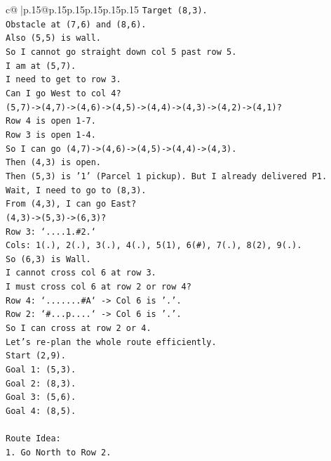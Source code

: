\documentclass{article}
\begin{document}
{\begin{supertabular}{c@{$\;$}|p{.15\linewidth}@{}p{.15\linewidth}p{.15\linewidth}p{.15\linewidth}p{.15\linewidth}p{.15\linewidth}}
{{{\texttt{Target (8,3).} \\
\texttt{Obstacle at (7,6) and (8,6).} \\
\texttt{Also (5,5) is wall.} \\
\texttt{So I cannot go straight down col 5 past row 5.} \\
\texttt{I am at (5,7).} \\
\texttt{I need to get to row 3.} \\
\texttt{Can I go West to col 4?} \\
\texttt{(5,7){-}>(4,7){-}>(4,6){-}>(4,5){-}>(4,4){-}>(4,3){-}>(4,2){-}>(4,1)?} \\
\texttt{Row 4 is open 1{-}7.} \\
\texttt{Row 3 is open 1{-}4.} \\
\texttt{So I can go (4,7){-}>(4,6){-}>(4,5){-}>(4,4){-}>(4,3).} \\
\texttt{Then (4,3) is open.} \\
\texttt{Then (5,3) is '1' (Parcel 1 pickup). But I already delivered P1.} \\
\texttt{Wait, I need to go to (8,3).} \\
\texttt{From (4,3), I can go East?} \\
\texttt{(4,3){-}>(5,3){-}>(6,3)?} \\
\texttt{Row 3: `....1.\#2.`} \\
\texttt{Cols: 1(.), 2(.), 3(.), 4(.), 5(1), 6(\#), 7(.), 8(2), 9(.).} \\
\texttt{So (6,3) is Wall.} \\
\texttt{I cannot cross col 6 at row 3.} \\
\texttt{I must cross col 6 at row 2 or row 4?} \\
\texttt{Row 4: `.......\#A` {-}> Col 6 is '.'.} \\
\texttt{Row 2: `\#...p....` {-}> Col 6 is '.'.} \\
\texttt{So I can cross at row 2 or 4.} \\
\texttt{Let's re{-}plan the whole route efficiently.} \\
\texttt{Start (2,9).} \\
\texttt{Goal 1: (5,3).} \\
\texttt{Goal 2: (8,3).} \\
\texttt{Goal 3: (5,6).} \\
\texttt{Goal 4: (8,5).} \\
\\ 
\texttt{Route Idea:} \\
\texttt{1. Go North to Row 2.} \\
}}}
\end{supertabular}}
\end{document}
